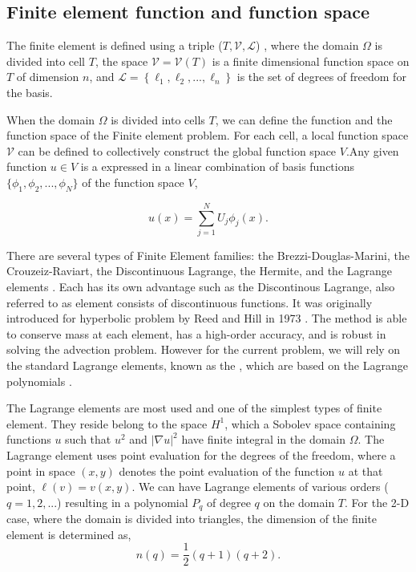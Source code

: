 \subsection*{Finite element function and function space}

The finite element is defined using a triple ($T, \mathcal{V}, \mathcal{L}$) \cite{Ciarlet1972}, where the domain $\Omega$ is divided into cell $T$, the space $\mathcal{V} = \mathcal{V}(T)$ is a finite dimensional function space on $T$ of dimension $n$, and $\mathcal{L} = \left\{ \ell_1,\ell_2,...,\ell_n \right\}$ is the set of degrees of freedom for the basis.

When the domain $\Omega$ is divided into cells $T$, we can define the function and the function space of the Finite element problem. For each cell, a local function space $\mathcal{V}$ can be defined to collectively construct the global function space $V$.Any given function $u \in V$ is a expressed in a linear combination of basis functions $\{\phi_1,\phi_2,...,\phi_N\}$  of the function space $V$, 

	\begin{equation}
	u(x) = \sum_{j=1}^N U_j\phi_j(x).
	\end{equation}

There are several types of Finite Element families: the Brezzi-Douglas-Marini, the Crouzeiz-Raviart, the Discontinuous Lagrange, the Hermite, and the Lagrange elements \cite{Logg2012a}. Each has its own advantage such as the Discontinous Lagrange, also referred to as  element consists of discontinuous functions. It was originally introduced for hyperbolic problem by Reed and Hill in 1973 \cite{Reed1973a}. The method is able to conserve mass at each element, has a high-order accuracy, and is robust in solving the advection problem. However for the current problem, we will rely on the standard Lagrange elements, known as the , which are based on the Lagrange polynomials \cite{Chen2011}. 

The Lagrange elements are most used and one of the simplest types of finite element. They reside belong to the space $H^1$, which a Sobolev space containing functions $u$ such that $u^2$ and $\left|\nabla u\right|^2$ have finite integral in the domain $\Omega$. The Lagrange element uses point evaluation for the degrees of the freedom, where a point in space $(x,y)$ denotes the point evaluation of the function $u$ at that point, $\ell(v) = v(x,y)$. We can have Lagrange elements of various orders ($q = 1, 2,...$) resulting in a polynomial $P_q$ of degree $q$ on the domain $T$. For the 2-D case, where the domain is divided into triangles, the dimension of the finite element is determined as,
	\begin{equation}
	n(q) = \frac{1}{2}(q + 1)(q + 2).
	\end{equation}
	
